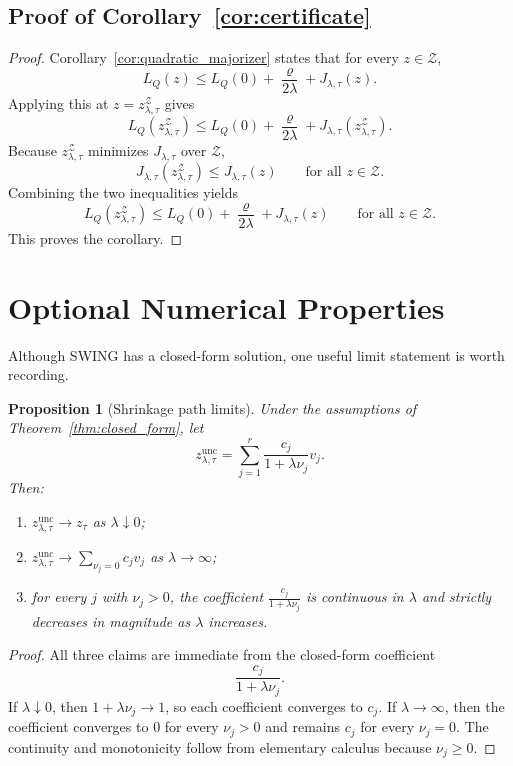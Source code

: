 \documentclass{article}
\newtheorem{proposition}{Proposition}
\newcommand{\cZ}{\mathcal{Z}}
\newcommand{\swing}{\textup{\textsc{SWING}}}
\begin{document}
\subsection{Proof of Corollary~\ref{cor:certificate}}

\begin{proof}
Corollary~\ref{cor:quadratic_majorizer} states that for every \(z\in\cZ\),
\[
L_Q(z)
\le
L_Q(0) + \frac{\varrho}{2\lambda}
+
J_{\lambda,\tau}(z).
\]
Applying this at \(z=z_{\lambda,\tau}^{\cZ}\) gives
\[
L_Q(z_{\lambda,\tau}^{\cZ})
\le
L_Q(0) + \frac{\varrho}{2\lambda}
+
J_{\lambda,\tau}(z_{\lambda,\tau}^{\cZ}).
\]
Because \(z_{\lambda,\tau}^{\cZ}\) minimizes \(J_{\lambda,\tau}\) over \(\cZ\),
\[
J_{\lambda,\tau}(z_{\lambda,\tau}^{\cZ}) \le J_{\lambda,\tau}(z)
\qquad
\text{for all } z\in\cZ.
\]
Combining the two inequalities yields
\[
L_Q(z_{\lambda,\tau}^{\cZ})
\le
L_Q(0) + \frac{\varrho}{2\lambda}
+
J_{\lambda,\tau}(z)
\qquad
\text{for all } z\in\cZ.
\]
This proves the corollary.
\end{proof}

\section{Optional Numerical Properties}

Although \swing{} has a closed-form solution, one useful limit statement is worth recording.

\begin{proposition}[Shrinkage path limits]
\label{prop:path}
Under the assumptions of Theorem~\ref{thm:closed_form}, let
\[
z_{\lambda,\tau}^{\mathrm{unc}} = \sum_{j=1}^r \frac{c_j}{1+\lambda\nu_j}v_j.
\]
Then:
\begin{enumerate}[leftmargin=1.4em]
    \item \(z_{\lambda,\tau}^{\mathrm{unc}} \to z_\tau\) as \(\lambda\downarrow 0\);
    \item \(z_{\lambda,\tau}^{\mathrm{unc}} \to \sum_{\nu_j=0} c_j v_j\) as \(\lambda\to\infty\);
    \item for every \(j\) with \(\nu_j>0\), the coefficient \(\frac{c_j}{1+\lambda\nu_j}\) is continuous in \(\lambda\) and strictly decreases in magnitude as \(\lambda\) increases.
\end{enumerate}
\end{proposition}

\begin{proof}
All three claims are immediate from the closed-form coefficient
\[
\frac{c_j}{1+\lambda\nu_j}.
\]
If \(\lambda\downarrow 0\), then \(1+\lambda\nu_j \to 1\), so each coefficient converges to \(c_j\). If \(\lambda\to\infty\), then the coefficient converges to \(0\) for every \(\nu_j>0\) and remains \(c_j\) for every \(\nu_j=0\). The continuity and monotonicity follow from elementary calculus because \(\nu_j\ge 0\).
\end{proof}
\end{document}
